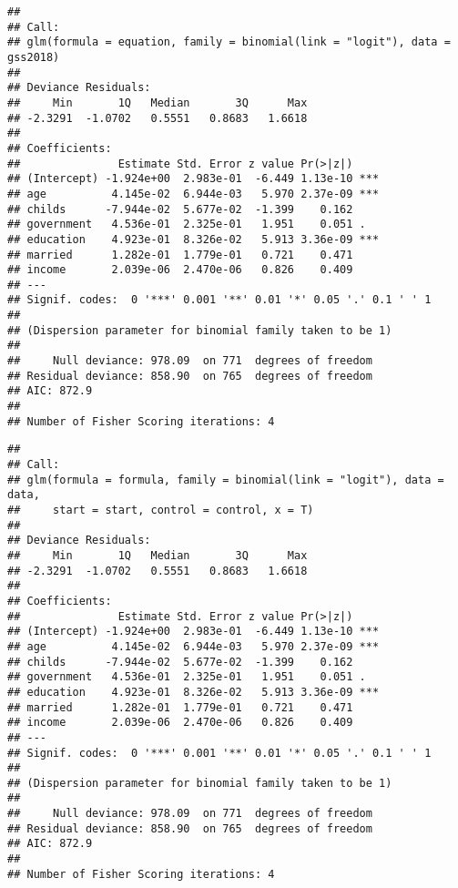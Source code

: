 \documentclass[
]{article}
\newenvironment{Shaded}{\begin{snugshade}}{\end{snugshade}}
\newcommand{\DataTypeTok}[1]{\textcolor[rgb]{0.13,0.29,0.53}{#1}}
\newcommand{\KeywordTok}[1]{\textcolor[rgb]{0.13,0.29,0.53}{\textbf{#1}}}
\newcommand{\NormalTok}[1]{#1}
\newcommand{\OperatorTok}[1]{\textcolor[rgb]{0.81,0.36,0.00}{\textbf{#1}}}
\newcommand{\StringTok}[1]{\textcolor[rgb]{0.31,0.60,0.02}{#1}}
\begin{document}
\begin{verbatim}
## 
## Call:
## glm(formula = equation, family = binomial(link = "logit"), data = gss2018)
## 
## Deviance Residuals: 
##     Min       1Q   Median       3Q      Max  
## -2.3291  -1.0702   0.5551   0.8683   1.6618  
## 
## Coefficients:
##               Estimate Std. Error z value Pr(>|z|)    
## (Intercept) -1.924e+00  2.983e-01  -6.449 1.13e-10 ***
## age          4.145e-02  6.944e-03   5.970 2.37e-09 ***
## childs      -7.944e-02  5.677e-02  -1.399    0.162    
## government   4.536e-01  2.325e-01   1.951    0.051 .  
## education    4.923e-01  8.326e-02   5.913 3.36e-09 ***
## married      1.282e-01  1.779e-01   0.721    0.471    
## income       2.039e-06  2.470e-06   0.826    0.409    
## ---
## Signif. codes:  0 '***' 0.001 '**' 0.01 '*' 0.05 '.' 0.1 ' ' 1
## 
## (Dispersion parameter for binomial family taken to be 1)
## 
##     Null deviance: 978.09  on 771  degrees of freedom
## Residual deviance: 858.90  on 765  degrees of freedom
## AIC: 872.9
## 
## Number of Fisher Scoring iterations: 4
\end{verbatim}

\begin{Shaded}
\end{Shaded}

\begin{verbatim}
## 
## Call:
## glm(formula = formula, family = binomial(link = "logit"), data = data, 
##     start = start, control = control, x = T)
## 
## Deviance Residuals: 
##     Min       1Q   Median       3Q      Max  
## -2.3291  -1.0702   0.5551   0.8683   1.6618  
## 
## Coefficients:
##               Estimate Std. Error z value Pr(>|z|)    
## (Intercept) -1.924e+00  2.983e-01  -6.449 1.13e-10 ***
## age          4.145e-02  6.944e-03   5.970 2.37e-09 ***
## childs      -7.944e-02  5.677e-02  -1.399    0.162    
## government   4.536e-01  2.325e-01   1.951    0.051 .  
## education    4.923e-01  8.326e-02   5.913 3.36e-09 ***
## married      1.282e-01  1.779e-01   0.721    0.471    
## income       2.039e-06  2.470e-06   0.826    0.409    
## ---
## Signif. codes:  0 '***' 0.001 '**' 0.01 '*' 0.05 '.' 0.1 ' ' 1
## 
## (Dispersion parameter for binomial family taken to be 1)
## 
##     Null deviance: 978.09  on 771  degrees of freedom
## Residual deviance: 858.90  on 765  degrees of freedom
## AIC: 872.9
## 
## Number of Fisher Scoring iterations: 4
\end{verbatim}
\end{document}
